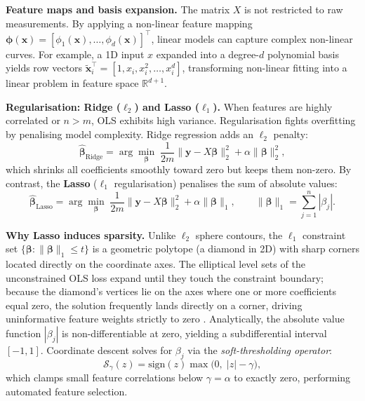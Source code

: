 \documentclass[11pt,a4paper]{article}
\begin{document}
	\textbf{Feature maps and basis expansion.} The matrix $X$ is not restricted to raw measurements. By applying a non-linear feature mapping $\boldsymbol{\phi}(\mathbf{x}) = [\phi_1(\mathbf{x}), \dots, \phi_d(\mathbf{x})]^{\!\top}$, linear models can capture complex non-linear curves. For example, a 1D input $x$ expanded into a degree-$d$ polynomial basis yields row vectors $\tilde{\mathbf{x}}_i^{\!\top} = [1, x_i, x_i^2, \dots, x_i^d]$, transforming non-linear fitting into a linear problem in feature space $\mathbb{R}^{d+1}$.
	
	\begin{practicebox}

	\end{practicebox}

	\textbf{Regularisation: Ridge ($\ell_2$) and Lasso ($\ell_1$).} When features are highly correlated or $n > m$, OLS exhibits high variance. Regularisation fights overfitting by penalising model complexity. Ridge regression adds an $\ell_2$ penalty:
	\begin{equation}
		\hat{\boldsymbol{\beta}}_{\text{Ridge}} = \arg\min_{\boldsymbol{\beta}}\; \frac{1}{2m}\|\mathbf{y} - X\boldsymbol{\beta}\|_2^{2} + \alpha \|\boldsymbol{\beta}\|_2^{2},
	\end{equation}
	which shrinks all coefficients smoothly toward zero but keeps them non-zero. By contrast, the \textbf{Lasso} ($\ell_1$ regularisation) penalises the sum of absolute values:
	\begin{equation}
		\hat{\boldsymbol{\beta}}_{\text{Lasso}} = \arg\min_{\boldsymbol{\beta}}\; \frac{1}{2m}\|\mathbf{y} - X\boldsymbol{\beta}\|_2^{2} + \alpha \|\boldsymbol{\beta}\|_1, \qquad \|\boldsymbol{\beta}\|_1 = \sum_{j=1}^{n} |\beta_j|.
	\end{equation}
	
	\textbf{Why Lasso induces sparsity.} Unlike $\ell_2$ sphere contours, the $\ell_1$ constraint set $\{\boldsymbol{\beta} : \|\boldsymbol{\beta}\|_1 \le t\}$ is a geometric polytope (a diamond in 2D) with sharp corners located directly on the coordinate axes. The elliptical level sets of the unconstrained OLS loss expand until they touch the constraint boundary; because the diamond's vertices lie on the axes where one or more coefficients equal zero, the solution frequently lands directly on a corner, driving uninformative feature weights strictly to zero \parencite{hastie2009}. Analytically, the absolute value function $|\beta_j|$ is non-differentiable at zero, yielding a subdifferential interval $[-1, 1]$. Coordinate descent solves for $\beta_j$ via the \emph{soft-thresholding operator}:
	\begin{equation}
		\mathcal{S}_{\gamma}(z) = \mathrm{sign}(z) \max\bigl(0,\; |z| - \gamma\bigr),
	\end{equation}
	which clamps small feature correlations below $\gamma = \alpha$ to exactly zero, performing automated feature selection.
	
\end{document}

